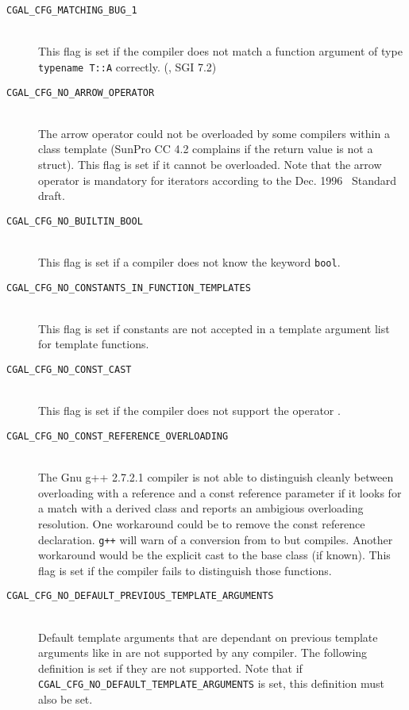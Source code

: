 \begin{description}
\item[{\tt CGAL\_CFG\_MATCHING\_BUG\_1}]~\\
 This flag is set if the compiler does not match a function
 argument of type {\tt typename T::A} correctly.
 (\eg, SGI 7.2)

\item[{\tt CGAL\_CFG\_NO\_ARROW\_OPERATOR}]~\\
  The arrow operator  could not be overloaded by
  some compilers within a class template (SunPro CC 4.2 complains if
  the return value is not a struct). This flag is set
  if it cannot be overloaded. Note that the arrow operator is
  mandatory for iterators according to the Dec. 1996 \CC\ Standard
  draft.

\item[{\tt CGAL\_CFG\_NO\_BUILTIN\_BOOL}]~\\
  This flag is set if a compiler does not know the keyword {\tt bool}.

\item[{\tt CGAL\_CFG\_NO\_CONSTANTS\_IN\_FUNCTION\_TEMPLATES}]~\\
  This flag is set if constants are not accepted in a template
  argument list for template functions.

\item[{\tt CGAL\_CFG\_NO\_CONST\_CAST}]~\\
  This flag is set if the compiler does not support the operator
  .

\item[{\tt CGAL\_CFG\_NO\_CONST\_REFERENCE\_OVERLOADING}]~\\
  The Gnu g++ 2.7.2.1 compiler is not able to distinguish cleanly between
  overloading with a reference and a const reference parameter if it
  looks for a match with a derived class and reports an ambigious
  overloading resolution. One workaround could be to remove the const
  reference declaration. {\tt g++} will warn of a conversion from  to  but compiles. Another workaround would be the
  explicit cast to the base class (if known).  This flag 
  is set if the compiler fails to distinguish those functions.

\item[{\tt CGAL\_CFG\_NO\_DEFAULT\_PREVIOUS\_TEMPLATE\_ARGUMENTS}]~\\
  Default template arguments that are dependant on previous template
  arguments like in 
  are not supported by any compiler. The following definition is set
  if they are not supported. Note that if {\tt
    CGAL\_CFG\_NO\_DEFAULT\_TEMPLATE\_ARGUMENTS} is set, this
  definition must also be set.


\end{description}
